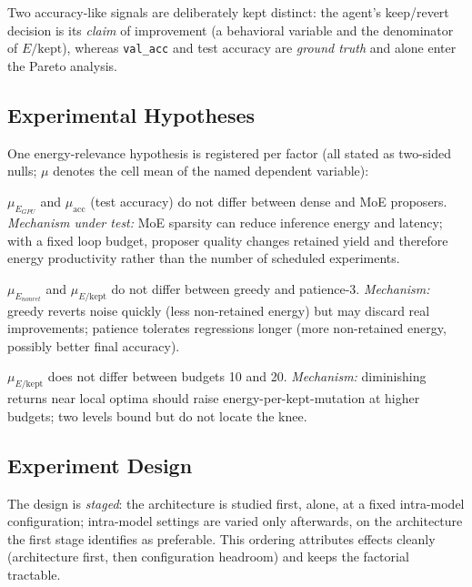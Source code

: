 Two accuracy-like signals are deliberately kept distinct: the agent's keep/revert decision is its \emph{claim} of improvement (a behavioral variable and the denominator of $E/\mathrm{kept}$), whereas \texttt{val\_acc} and test accuracy are \emph{ground truth} and alone enter the Pareto analysis.

\subsection{Experimental Hypotheses}

One energy-relevance hypothesis is registered per factor (all stated as two-sided nulls; $\mu$ denotes the cell mean of the named dependent variable):

\begin{description}[leftmargin=1.2em]
\item[H$_{0}^{\mathit{prop}}$:] $\mu_{E_{\mathit{GPU}}}$ and $\mu_{\mathrm{acc}}$ (test accuracy) do not differ between dense and MoE proposers. \emph{Mechanism under test:} MoE sparsity can reduce inference energy and latency; with a fixed loop budget, proposer quality changes retained yield and therefore energy productivity rather than the number of scheduled experiments.
\item[H$_{0}^{\mathit{pat}}$:] $\mu_{E_{\mathit{nonret}}}$ and $\mu_{E/\mathrm{kept}}$ do not differ between greedy and patience-3. \emph{Mechanism:} greedy reverts noise quickly (less non-retained energy) but may discard real improvements; patience tolerates regressions longer (more non-retained energy, possibly better final accuracy).
\item[H$_{0}^{\mathit{bud}}$:] $\mu_{E/\mathrm{kept}}$ does not differ between budgets 10 and 20. \emph{Mechanism:} diminishing returns near local optima should raise energy-per-kept-mutation at higher budgets; two levels bound but do not locate the knee.
\end{description}

\subsection{Experiment Design}\label{sec:design}

The design is \emph{staged}: the architecture is studied first, alone, at a fixed intra-model configuration; intra-model settings are varied only afterwards, on the architecture the first stage identifies as preferable. This ordering attributes effects cleanly (architecture first, then configuration headroom) and keeps the factorial tractable.


